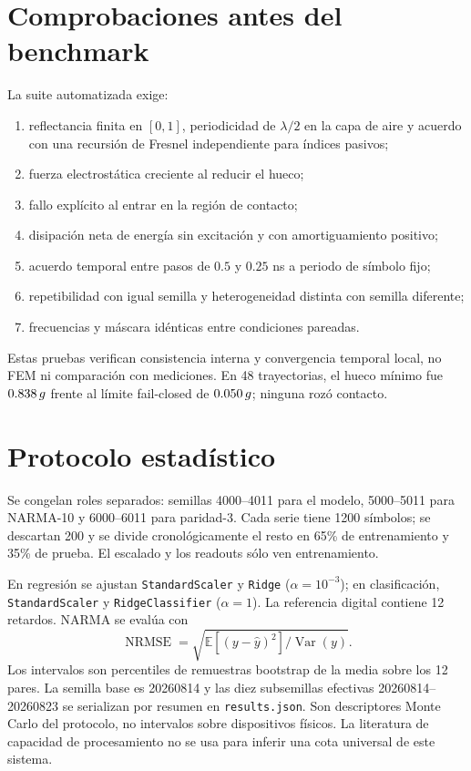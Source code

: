 \documentclass[11pt,a4paper]{article}
\begin{document}
\section{Comprobaciones antes del benchmark}
La suite automatizada exige:
\begin{enumerate}
  \item reflectancia finita en $[0,1]$, periodicidad de $\lambda/2$ en la capa de aire y acuerdo con una recursión de Fresnel independiente para índices pasivos;
  \item fuerza electrostática creciente al reducir el hueco;
  \item fallo explícito al entrar en la región de contacto;
  \item disipación neta de energía sin excitación y con amortiguamiento positivo;
  \item acuerdo temporal entre pasos de $0.5$ y $0.25$ ns a periodo de símbolo fijo;
  \item repetibilidad con igual semilla y heterogeneidad distinta con semilla diferente;
  \item frecuencias y máscara idénticas entre condiciones pareadas.
\end{enumerate}
Estas pruebas verifican consistencia interna y convergencia temporal local, no FEM ni comparación con mediciones. En 48 trayectorias, el hueco mínimo fue $0.838\,g$ frente al límite fail-closed de $0.050\,g$; ninguna rozó contacto.

\section{Protocolo estadístico}
Se congelan roles separados: semillas 4000--4011 para el modelo, 5000--5011 para NARMA-10 y 6000--6011 para paridad-3. Cada serie tiene 1200 símbolos; se descartan 200 y se divide cronológicamente el resto en 65\% de entrenamiento y 35\% de prueba. El escalado y los readouts sólo ven entrenamiento.

En regresión se ajustan \texttt{StandardScaler} y \texttt{Ridge} ($\alpha=10^{-3}$); en clasificación, \texttt{StandardScaler} y \texttt{RidgeClassifier} ($\alpha=1$). La referencia digital contiene 12 retardos. NARMA se evalúa con
\[
 \operatorname{NRMSE}=\sqrt{\mathbb E[(y-\hat y)^2]/\operatorname{Var}(y)}.
\]
Los intervalos son percentiles de \BootstrapSamples{} remuestras bootstrap de la media sobre los 12 pares. La semilla base es 20260814 y las diez subsemillas efectivas 20260814--20260823 se serializan por resumen en \texttt{results.json}. Son descriptores Monte Carlo del protocolo, no intervalos sobre dispositivos físicos. La literatura de capacidad de procesamiento \cite{dambre2012} no se usa para inferir una cota universal de este sistema.
\end{document}
